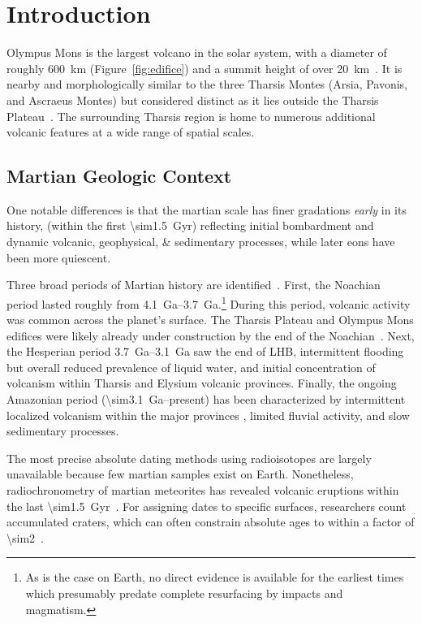 \chapter{Introduction}

Olympus Mons is the largest volcano in the solar system, with a diameter of roughly \qty{600}{\km} (Figure~\ref{fig:edifice}) and a summit height of over \qty{20}{\km}~\parencite{plescia_morphometric_2004}. It is nearby and morphologically similar to the three Tharsis Montes (Arsia, Pavonis, and Ascraeus Montes) but considered distinct as it lies outside the Tharsis Plateau~\parencite{bleacher_trends_2007}. The surrounding Tharsis region is home to numerous additional volcanic features at a wide range of spatial scales.

\section{Martian Geologic Context}

One notable differences is that the martian scale has finer gradations \textit{early} in its history, (within the first \qty{\sim1.5}{Gyr}) reflecting initial bombardment and dynamic volcanic, geophysical, \& sedimentary processes, while later eons have been more quiescent. 

Three broad periods of Martian history are identified~\parencite{carr_geologic_2010}. First, the Noachian period lasted roughly from \qtyrange{4.1}{3.7}{Ga}.\footnote{As is the case on Earth, no direct evidence is available for the earliest times which presumably predate complete resurfacing by impacts and magmatism.} During this period, volcanic activity was common across the planet's surface. The Tharsis Plateau and Olympus Mons edifices were likely already under construction by the end of the Noachian~\parencite[][etc.]{isherwood_volcanic_2013,broquet_gravitational_2019}. Next, the Hesperian period \qtyrange{3.7}{3.1}{Ga} saw the end of \ac{LHB}, intermittent flooding but overall reduced prevalence of liquid water, and initial concentration of volcanism within Tharsis and Elysium volcanic provinces. Finally, the ongoing Amazonian period (\qty{\sim3.1}{Ga}--present) has been characterized by intermittent localized volcanism within the major provinces \parencite[e.g.,][]{grott_long-term_2013}, limited fluvial activity, and slow sedimentary processes.

The most precise absolute dating methods using radioisotopes are largely unavailable because few martian samples exist on Earth. Nonetheless, radiochronometry of martian meteorites has revealed volcanic eruptions within the last \qty{\sim1.5}{Gyr}~\parencite[e.g.,][]{cohen_taking_2017}. For assigning dates to specific surfaces, researchers count accumulated craters, which can often constrain absolute ages to within a factor of \num{\sim2}~\parencite[e.g.,][]{kneissl_map-projection-independent_2011}.

